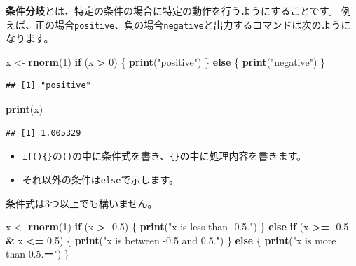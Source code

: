 \documentclass[]{bxjsreport}
\newenvironment{Shaded}{\begin{snugshade}}{\end{snugshade}}
\newcommand{\ControlFlowTok}[1]{\textcolor[rgb]{0.13,0.29,0.53}{\textbf{#1}}}
\newcommand{\DecValTok}[1]{\textcolor[rgb]{0.00,0.00,0.81}{#1}}
\newcommand{\FloatTok}[1]{\textcolor[rgb]{0.00,0.00,0.81}{#1}}
\newcommand{\KeywordTok}[1]{\textcolor[rgb]{0.13,0.29,0.53}{\textbf{#1}}}
\newcommand{\NormalTok}[1]{#1}
\newcommand{\OperatorTok}[1]{\textcolor[rgb]{0.81,0.36,0.00}{\textbf{#1}}}
\newcommand{\StringTok}[1]{\textcolor[rgb]{0.31,0.60,0.02}{#1}}
\providecommand{\tightlist}{%
  \setlength{\itemsep}{0pt}\setlength{\parskip}{0pt}}
\begin{document}
\textbf{条件分岐}とは、特定の条件の場合に特定の動作を行うようにすることです。
例えば、正の場合\texttt{positive}、負の場合\texttt{negative}と出力するコマンドは次のようになります。

\begin{Shaded}
\begin{Highlighting}[]
\NormalTok{x <-}\StringTok{ }\KeywordTok{rnorm}\NormalTok{(}\DecValTok{1}\NormalTok{)}
\ControlFlowTok{if}\NormalTok{ (x }\OperatorTok{>}\StringTok{ }\DecValTok{0}\NormalTok{) \{}
  \KeywordTok{print}\NormalTok{(}\StringTok{"positive"}\NormalTok{)}
\NormalTok{\} }\ControlFlowTok{else}\NormalTok{ \{}
  \KeywordTok{print}\NormalTok{(}\StringTok{"negative"}\NormalTok{)}
\NormalTok{\}}
\end{Highlighting}
\end{Shaded}

\begin{verbatim}
## [1] "positive"
\end{verbatim}

\begin{Shaded}
\begin{Highlighting}[]
\KeywordTok{print}\NormalTok{(x)}
\end{Highlighting}
\end{Shaded}

\begin{verbatim}
## [1] 1.005329
\end{verbatim}

\begin{itemize}
\tightlist
\item
  \texttt{if()\{\}}の\texttt{()}の中に条件式を書き、\texttt{\{\}}の中に処理内容を書きます。
\item
  それ以外の条件は\texttt{else}で示します。
\end{itemize}

条件式は3つ以上でも構いません。

\begin{Shaded}
\begin{Highlighting}[]
\NormalTok{x <-}\StringTok{ }\KeywordTok{rnorm}\NormalTok{(}\DecValTok{1}\NormalTok{)}
\ControlFlowTok{if}\NormalTok{ (x }\OperatorTok{>}\StringTok{ }\FloatTok{-0.5}\NormalTok{) \{}
  \KeywordTok{print}\NormalTok{(}\StringTok{"x is less than -0.5."}\NormalTok{)}
\NormalTok{\} }\ControlFlowTok{else} \ControlFlowTok{if}\NormalTok{ (x }\OperatorTok{>=}\StringTok{ }\FloatTok{-0.5} \OperatorTok{&}\StringTok{ }\NormalTok{x }\OperatorTok{<=}\StringTok{ }\FloatTok{0.5}\NormalTok{) \{}
  \KeywordTok{print}\NormalTok{(}\StringTok{"x is between -0.5 and 0.5."}\NormalTok{)}
\NormalTok{\} }\ControlFlowTok{else}\NormalTok{ \{}
  \KeywordTok{print}\NormalTok{(}\StringTok{"x is more than 0.5.ー"}\NormalTok{)}
\NormalTok{\}}
\end{Highlighting}
\end{Shaded}
\end{document}
